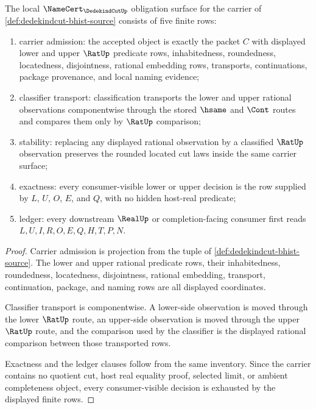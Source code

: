 \begin{theorem}
\label{thm:dedekindcut-namecert-obligation-surface}
The local $\NameCert_{\DedekindCutUp}$ obligation surface for the carrier of \autoref{def:dedekindcut-bhist-source} consists of five finite rows:
\begin{enumerate}
\item carrier admission: the accepted object is exactly the packet $C$ with displayed lower and upper $\RatUp$ predicate rows, inhabitedness, roundedness, locatedness, disjointness, rational embedding rows, transports, continuations, package provenance, and local naming evidence;
\item classifier transport: classification transports the lower and upper rational observations componentwise through the stored $\hsame$ and $\Cont$ routes and compares them only by $\RatUp$ comparison;
\item stability: replacing any displayed rational observation by a classified $\RatUp$ observation preserves the rounded located cut laws inside the same carrier surface;
\item exactness: every consumer-visible lower or upper decision is the row supplied by $L$, $U$, $O$, $E$, and $Q$, with no hidden host-real predicate;
\item ledger: every downstream $\RealUp$ or completion-facing consumer first reads $L,U,I,R,O,E,Q,H,T,P,N$.
\end{enumerate}
\end{theorem}
\begin{proof}
Carrier admission is projection from the tuple of \autoref{def:dedekindcut-bhist-source}. The lower and upper rational predicate rows, their inhabitedness, roundedness, locatedness, disjointness, rational embedding, transport, continuation, package, and naming rows are all displayed coordinates.

Classifier transport is componentwise. A lower-side observation is moved through the lower $\RatUp$ route, an upper-side observation is moved through the upper $\RatUp$ route, and the comparison used by the classifier is the displayed rational comparison between those transported rows.

Exactness and the ledger clauses follow from the same inventory. Since the carrier contains no quotient cut, host real equality proof, selected limit, or ambient completeness object, every consumer-visible decision is exhausted by the displayed finite rows.
\end{proof}

